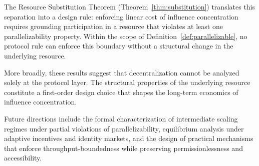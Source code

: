 \documentclass[manuscript,review]{acmart}
\theoremstyle{remark}
\begin{document}
	The Resource Substitution Theorem
	(Theorem~\ref{thm:substitution}) translates this
	separation into a design rule: enforcing linear
	cost of influence concentration requires grounding
	participation in a resource that violates at least
	one parallelizability property.
	Within the scope of Definition~\ref{def:parallelizable},
	no protocol rule can enforce this boundary without a
	structural change in the underlying resource.
	
	More broadly, these results suggest that
	decentralization cannot be analyzed solely at the
	protocol layer.
	The structural properties of the underlying resource
	constitute a first-order design choice that shapes
	the long-term economics of influence concentration.
	
	Future directions include the formal characterization
	of intermediate scaling regimes under partial
	violations of parallelizability, equilibrium analysis
	under adaptive incentives and identity markets, and
	the design of practical mechanisms that enforce
	throughput-boundedness while preserving
	permissionlessness and accessibility.
	
	
	
	
	
\end{document}
